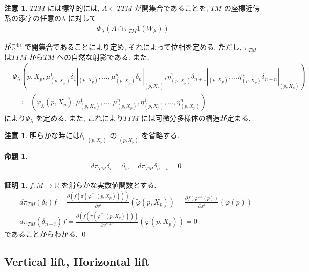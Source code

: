 \documentclass[twocolumn, landscape, a4paper , 8pt, fleqn, titlepage ]{jsarticle}
\theoremstyle{definition}
\newtheorem{prop}[dfn]{命題}
\newtheorem*{pf*}{証明}
\newtheorem{remark}[dfn]{注意}
\begin{document}
\begin{remark}
$TTM$ には標準的には, $A \subset TTM$ が開集合であることを, $TM$ の座標近傍系の添字の任意の$\lambda$ に対して
\begin{align*} \Phi_\lambda (A \cap \pi_{TM} ^-1 (W_\lambda)  ) \end{align*}

が$\mathbb R^{4n}$ で開集合であることにより定め, それによって位相を定める. ただし, $\pi_{TM}$ は$TTM$ から$TM$ への自然な射影である. また, 
\begin{align*} &\Phi_\lambda  (p, X_p, \mu^1_{ (p, X_p)} \delta_1|_{(p,X_p)}, \ldots , \mu^n _{(p,X_p) } \delta_n|_{(p,X_p)}, \eta^1 _{(p,X_p)} \delta_{n+1}|_{(p,X_p)} , \ldots \eta^n_{(p,X_p)} \delta_{n+n}|_{(p,X_p)} ) \\  &\quad \coloneqq  ( \tilde \varphi_\lambda (p, X_p) , \mu^1_{ (p, X_p)} , \ldots , \mu^n _{(p,X_p) } , \eta^1 _{(p, X_p)}, \ldots ,\eta^n _{(p, X_p)}  )
\end{align*}
により$\Phi_\lambda $ を定める. また, これにより$TTM$ には可微分多様体の構造が定まる. 
\end{remark}


\begin{remark}
明らかな時には$\delta_i |_{(p,X_p)} $ の$|_{(p,X_p)}$ を省略する. 
\end{remark}

\begin{prop}
\begin{align*} &d\pi_{TM} \delta_i = \partial_i, \quad d \pi_{TM} \delta_{n+i} = 0  \end{align*}
\end{prop}
\begin{pf*}$f: M \rightarrow \mathbb R$ を滑らかな実数値関数とする. 
\begin{align*} &d\pi_{TM} (\delta_i) f = \frac{ \partial(f (\pi (\tilde \varphi^{-1} (p, X_p)) ) ) }{\partial v^i } (\tilde \varphi (p,X_p)) =  \frac{\partial f (\varphi^{-1} (p) )}{\partial x^i} (\varphi (p) )  \\ 
&d\pi_{TM} (\delta_{n+i}) f = \frac{ \partial(f (\pi (\tilde \varphi^{-1} (p, X_p)) ) ) }{\partial v^{n+ i }} (\tilde \varphi (p,X_p)) = 0  
\end{align*}
であることからわかる. 
\qed
\end{pf*}

\newpage
\subsection{Vertical lift, Horizontal lift}
\end{document}
